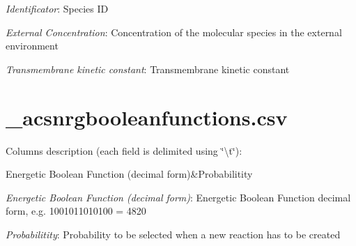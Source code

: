 \begin{DoxyItemize}
\item {\itshape Identificator}\-: Species I\-D
\item {\itshape External Concentration}\-: Concentration of the molecular species in the external environment
\item {\itshape Transmembrane kinetic constant}\-: Transmembrane kinetic constant \par
 
\end{DoxyItemize}\hypertarget{a00004_subEnergy}{}\section{\-\_\-acsnrgbooleanfunctions.\-csv}\label{a00004_subEnergy}
Columns description (each field is delimited using \char`\"{}\textbackslash{}t\char`\"{})\-: \begin{TabularC}{2}
\hline
Energetic Boolean Function (decimal form)&Probabilitity  \\
\end{TabularC}

\begin{DoxyItemize}
\item {\itshape Energetic Boolean Function (decimal form)}\-: Energetic Boolean Function decimal form, e.\-g. 1001011010100 = 4820
\item {\itshape Probabilitity}\-: Probability to be selected when a new reaction has to be created 
\end{DoxyItemize}